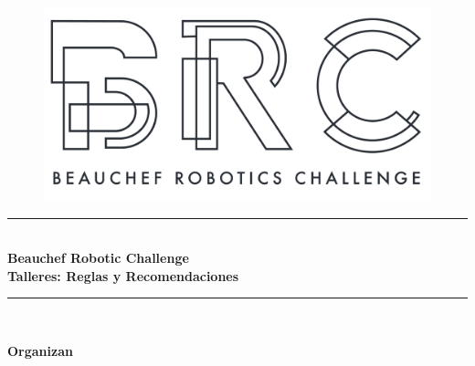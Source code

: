 \begin{titlepage} %
  \newcommand{\HRule}{\rule{\linewidth}{0.5mm}} %
  
  \center %
  

  \begin{figure}
    \centering
    \includegraphics[width=0.5\linewidth]{./images/logos/BRC_SinFondo.png}
  \end{figure}

  
  \HRule\\[0.4cm]
  
  {\Huge\bfseries Beauchef Robotic Challenge}\\[0.4cm] %
  {\LARGE\bfseries Talleres: Reglas y Recomendaciones}
  \HRule\\[1.5cm]
  
  
  \vfill\vfill

  {\Large\bfseries Organizan}


\end{titlepage}
